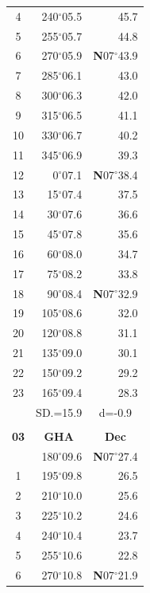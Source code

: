 \documentclass[10pt, a4paper]{report}
\begin{document}
\begin{scriptsize}
\begin{tabular*}{0.2\textwidth}[t]{@{\extracolsep{\fill}}|c|rr|}
4 & 240$^\circ$05.5 & 45.7\\
5 & 255$^\circ$05.7 & 44.8\\[2Pt]
6 & 270$^\circ$05.9 & \textbf{N}07$^\circ$43.9\\
7 & 285$^\circ$06.1 & 43.0\\
8 & 300$^\circ$06.3 & 42.0\\
9 & 315$^\circ$06.5 & \raisebox{0.24ex}{\boldmath$\cdot$~\boldmath$\cdot$~~}41.1\\
10 & 330$^\circ$06.7 & 40.2\\
11 & 345$^\circ$06.9 & 39.3\\[2Pt]
12 & 0$^\circ$07.1 & \textbf{N}07$^\circ$38.4\\
13 & 15$^\circ$07.4 & 37.5\\
14 & 30$^\circ$07.6 & 36.6\\
15 & 45$^\circ$07.8 & \raisebox{0.24ex}{\boldmath$\cdot$~\boldmath$\cdot$~~}35.6\\
16 & 60$^\circ$08.0 & 34.7\\
17 & 75$^\circ$08.2 & 33.8\\[2Pt]
18 & 90$^\circ$08.4 & \textbf{N}07$^\circ$32.9\\
19 & 105$^\circ$08.6 & 32.0\\
20 & 120$^\circ$08.8 & 31.1\\
21 & 135$^\circ$09.0 & \raisebox{0.24ex}{\boldmath$\cdot$~\boldmath$\cdot$~~}30.1\\
22 & 150$^\circ$09.2 & 29.2\\
23 & 165$^\circ$09.4 & 28.3\\
\hline
\rule{0pt}{2.4ex} & \multicolumn{1}{c}{SD.=15.9} & \multicolumn{1}{c|}{d=-0.9}\\
\hline
\multicolumn{1}{c}{}\\[-0.5ex]\hline
\multicolumn{1}{|c|}{\rule{0pt}{2.6ex}\textbf{03}} & \multicolumn{1}{c}{\textbf{GHA}} & \multicolumn{1}{c|}{\textbf{Dec}}\\
\hline\rule{0pt}{2.6ex}\noindent
0 & 180$^\circ$09.6 & \textbf{N}07$^\circ$27.4\\
1 & 195$^\circ$09.8 & 26.5\\
2 & 210$^\circ$10.0 & 25.6\\
3 & 225$^\circ$10.2 & \raisebox{0.24ex}{\boldmath$\cdot$~\boldmath$\cdot$~~}24.6\\
4 & 240$^\circ$10.4 & 23.7\\
5 & 255$^\circ$10.6 & 22.8\\[2Pt]
6 & 270$^\circ$10.8 & \textbf{N}07$^\circ$21.9\\

\end{tabular*}
\end{scriptsize}
\end{document}
